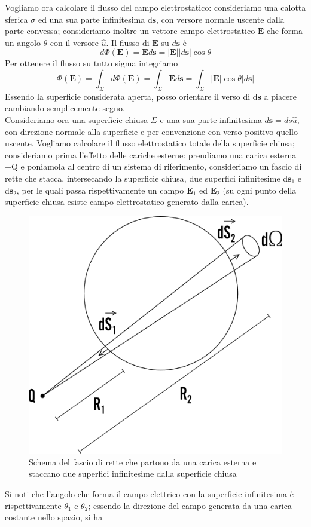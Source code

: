 \documentclass[10pt,a4paper]{article}
\begin{document}
Vogliamo ora calcolare il flusso del campo elettrostatico: consideriamo una calotta sferica \(\sigma\) ed una sua parte infinitesima d$\mathbf{s}$, con versore normale uscente dalla parte convessa; consideriamo inoltre un vettore campo elettrostatico $\mathbf{E}$ che forma un angolo \(\theta\) con il versore $\hat{u}$. Il flusso di $\mathbf{E}$ su \(d\mathbf{s}\) è 
\[d\Phi(\mathbf{E}) = \mathbf{E}d\mathbf{s} = |\mathbf{E}||d\mathbf{s}|\cos\theta\]
Per ottenere il flusso su tutto sigma integriamo 
\[\Phi(\mathbf{E}) = \int_{\Sigma}d\Phi(\mathbf{E}) = \int_{\Sigma}\mathbf{E}d\mathbf{s} = \int_{\Sigma}|\mathbf{E}|\cos\theta|d\mathbf{s}|\]
Essendo la superficie considerata aperta, posso orientare il verso di d$\mathbf{s}$ a piacere cambiando semplicemente segno.\\
Consideriamo ora una superficie chiusa $\Sigma$ e una sua parte infinitesima $d\mathbf{s} = ds \hat{u}$, con direzione normale alla superficie e per convenzione con verso positivo quello uscente. Vogliamo calcolare il flusso elettrostatico totale della superficie chiusa; consideriamo prima l'effetto delle cariche esterne: prendiamo una carica esterna +Q e poniamola al centro di un sistema di riferimento, consideriamo un fascio di rette che stacca, intersecando la superficie chiusa, due superfici infinitesime d$\mathbf{s}_1$ e d$\mathbf{s}_2$, per le quali passa rispettivamente un campo $\mathbf{E}_1$ ed $\mathbf{E}_2$ (su ogni punto della superficie chiusa esiste campo elettrostatico generato dalla carica).  
\begin{figure}[h!]
	\centering
	\includegraphics[width=0.5\linewidth]{images/thm_gauss_1}
	\caption{Schema del fascio di rette che partono da una carica esterna e staccano due superfici infinitesime dalla superficie chiusa}
	\label{fig:thmgauss1}
\end{figure}
\FloatBarrier
Si noti che l'angolo che forma il campo elettrico con la superficie infinitesima è rispettivamente \(\theta_1\) e \(\theta_2\); essendo la direzione del campo generata da una carica costante nello spazio, si ha
\end{document}
